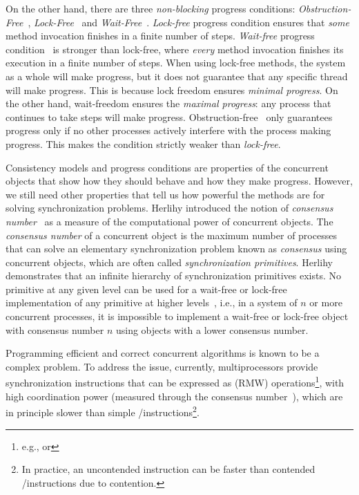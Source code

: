On the other hand, there are three \textit{non-blocking} progress conditions: \textit{Obstruction-Free}~\cite{DBLP_conf_icdcs_HerlihyLM03}, \textit{Lock-Free}~\cite{DBLP_journals_toplas_HerlihyW90} and \textit{Wait-Free}~\cite{DBLP_journals_toplas_Herlihy91}.
\textit{Lock-free} progress condition ensures that \textit{some} method invocation finishes in a finite number of steps. \textit{Wait-free} progress condition~\cite{DBLP_journals_toplas_Herlihy91} is stronger than lock-free, where \textit{every} method invocation finishes its execution in a finite number of steps. When using lock-free methods, the system as a whole will make progress, but it does not guarantee that any specific thread will make progress. This is because lock freedom ensures \textit{minimal progress}. On the other hand, wait-freedom ensures the \textit{maximal progress}: any process that continues to take steps will make progress. Obstruction-free~\cite{DBLP_conf_icdcs_HerlihyLM03} only guarantees progress only if no other processes actively interfere with the process making progress. This makes the condition strictly weaker than \textit{lock-free}. %

Consistency models and progress conditions are properties of the concurrent objects that show how they should behave and how they make progress. However, we still need other properties that tell us how powerful the methods are for solving synchronization problems. Herlihy introduced the notion of \textit{consensus number}~\cite{DBLP_journals_toplas_Herlihy91} as a measure of the computational power of concurrent objects. The \textit{consensus number} of a concurrent object is the maximum number of processes that can solve an elementary synchronization problem known as \textit{consensus} using concurrent objects, which are often called \textit{synchronization primitives}. Herlihy demonstrates that an infinite hierarchy of synchronization primitives exists. No primitive at any given level can be used for a wait-free or lock-free implementation of any primitive at higher levels~\cite{DBLP_journals_toplas_Herlihy91}, i.e., in a system of \(n\) or more concurrent processes, it is impossible to implement a wait-free or lock-free object with consensus number \(n\) using objects with a lower consensus number.

Programming efficient and correct concurrent algorithms is known to be a complex problem. To address the issue, currently, multiprocessors provide synchronization instructions that can be expressed as \RMW (RMW) operations\footnote{e.g., \CAS or \TAS}, with high coordination power (measured through the consensus number~\cite{DBLP_journals_toplas_Herlihy91}), which are in principle slower than simple \R/\W instructions\footnote{In practice, an uncontended \RMW instruction can be faster than contended \R/\W instructions due to contention.}.

